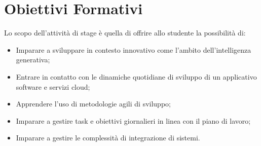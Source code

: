 \section*{Obiettivi Formativi}
Lo scopo dell’attività di stage è quella di offrire allo studente la possibilità di:
\begin{itemize}
    \item Imparare a sviluppare in contesto innovativo come l’ambito dell’intelligenza generativa;
    \item Entrare in contatto con le dinamiche quotidiane di sviluppo di un applicativo software e servizi cloud;
    \item Apprendere l’uso di metodologie agili di sviluppo;
    \item Imparare a gestire task e obiettivi giornalieri in linea con il piano di lavoro;
    \item Imparare a gestire le complessità di integrazione di sistemi.
\end{itemize}